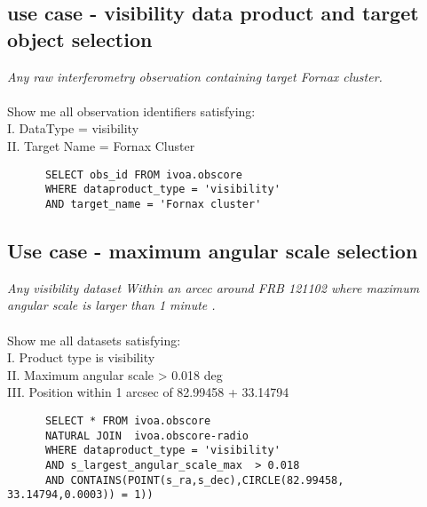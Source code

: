 
\subsection{ use case - visibility data product and target object selection }
\textit{Any raw interferometry observation containing target Fornax cluster.}\\
\\
Show me all  observation identifiers satisfying:\\
I. DataType = visibility \\
II. Target Name = Fornax Cluster \\
\begin{verbatim}
      SELECT obs_id FROM ivoa.obscore
      WHERE dataproduct_type = 'visibility' 
      AND target_name = 'Fornax cluster'
\end{verbatim}


\subsection{Use case - maximum angular scale selection}
\textit{Any visibility dataset Within an arcec around FRB 121102  where  maximum angular scale is larger than 1 minute .}\\ \\
Show me all datasets satisfying:\\
I. Product type is visibility \\
II. Maximum angular scale  >  0.018 deg \\
III. Position within 1 arcsec of 82.99458 + 33.14794
\begin{verbatim}
      SELECT * FROM ivoa.obscore 
      NATURAL JOIN  ivoa.obscore-radio
      WHERE dataproduct_type = 'visibility' 
      AND s_largest_angular_scale_max  > 0.018 
      AND CONTAINS(POINT(s_ra,s_dec),CIRCLE(82.99458, 33.14794,0.0003)) = 1))
\end{verbatim}

